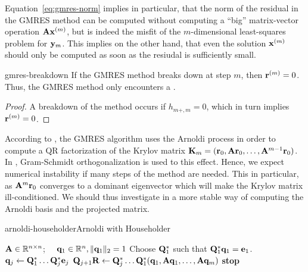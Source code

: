 \begin{remark}
  Equation~\eqref{eq:gmres-norm} implies in particular, that the norm
  of the residual in the GMRES method can be computed without
  computing a ``big'' matrix-vector operation $\mathbf A\mathbf x^{(m)}$, but is
  indeed the misfit of the $m$-dimensional least-squares problem for
  $\mathbf y_m$. This implies on the other hand, that even the solution
  $\mathbf x^{(m)}$ should only be computed as soon as the resiudal is
  sufficiently small.
\end{remark}

\begin{Lemma}{gmres-breakdown}
  If the GMRES method breaks down at step $m$, then
  $\mathbf r^{(m)}=0$. Thus, the GMRES method only encounters a
  .
\end{Lemma}

\begin{proof}
  A breakdown of the method occurs if $h_{m+,m} = 0$, which in turn
  implies $\mathbf r^{(m)} = 0$.
\end{proof}

\begin{intro}
  According to , the GMRES
  algorithm uses the Arnoldi process in order to compute a QR
  factorization of the Krylov matrix
  $\mathbf K_m = (\mathbf r_0,\mathbf A\mathbf r_0,\dots,\mathbf A^{m-1}\mathbf r_0)$. In
  , Gram-Schmidt orthogonalization is
  used to this effect. Hence, we expect numerical instability if many
  steps of the method are needed. This in particular, as
  $\mathbf A^m\mathbf r_0$ converges to a dominant eigenvector which will make
  the Krylov matrix ill-conditioned. We should thus investigate in a
  more stable way of computing the Arnoldi basis and the projected
  matrix.
\end{intro}


\begin{Algorithm*}{arnoldi-householder}{Arnoldi with Householder}
  \begin{algorithmic}[1]
    \Require $\mathbf A\in\mathbb R^{n\times n}$; $\quad\mathbf q_1\in\mathbb R^n, \lVert\mathbf q_1\rVert_2 = 1$
    \State Choose $\mathbf Q_1^*$ such that $\mathbf Q_1^*\mathbf q_1 = \mathbf e_1$.
    \State $\mathbf q_j \gets \mathbf Q_1^*\dots\mathbf Q_j^*\mathbf e_j$
    \State $\mathbf Q_{j+1}\mathbf R \gets \mathbf Q_j^*\dots\mathbf Q_1^*(\mathbf q_1,\mathbf A\mathbf q_1,\dots,\mathbf A\mathbf q_m)$
     \textbf{stop}\EndIf
    \EndFor
  \end{algorithmic}
\end{Algorithm*}

